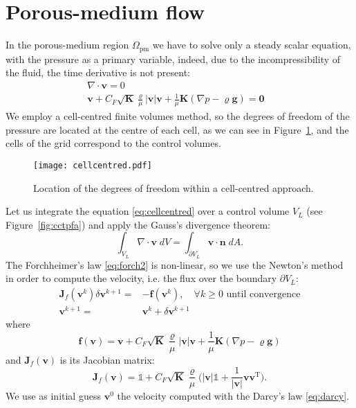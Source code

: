 \section{Porous-medium flow}
In the porous-medium region $\Omega_\text{pm}$ we have to solve only a steady 
scalar equation, with the pressure as a primary variable, indeed, due to the 
incompressibility of the fluid, the time derivative is not present:
\begin{align}
\label{eq:cellcentred}	\nabla \cdot \mathbf{v} = 0&\\
\label{eq:forch2}	\mathbf{v} + C_F \sqrt{\mathbf{K}} \frac{\varrho}{\mu} 
	|\mathbf{v}|\mathbf{v} + \frac{1}{\mu} \mathbf{K}(\nabla p - \varrho 
	\mathbf{g} ) = \mathbf{0}&
\end{align}
We employ a cell-centred finite volumes method, so the degrees of freedom of 
the pressure are located at the centre of each cell, as we can see in 
Figure~\ref{fig:cellcentred}, and the cells of the grid correspond to the 
control volumes.
\begin{figure}
	\centering
	\texttt{[image: cellcentred.pdf]}
	\caption[Cell-centred grid]{Location of the degrees of freedom within a 
	cell-centred approach.}
	\label{fig:cellcentred}
\end{figure}

Let us integrate the equation \eqref{eq:cellcentred} over a control volume 
$V_L$ (see Figure~\ref{fig:cctpfa}) and apply the Gauss's divergence theorem:
\begin{equation}
\int_{V_L} \nabla \cdot \mathbf{v} \; dV = \int_{\partial V_L} \mathbf{v} \cdot 
\mathbf{n} \; dA.
\end{equation}
The Forchheimer's law \eqref{eq:forch2} is non-linear, so we use the Newton's 
method in order to compute the velocity, i.e. the flux over the boundary 
$\partial 
V_L$:
\begin{align}
	\mathbf{J}_f(\mathbf{v}^k) \delta \mathbf{v}^{k+1} =& 
	-\mathbf{f}(\mathbf{v}^k), \quad \text{$\forall k\geq 0$ until 
	convergence}\\
	\mathbf{v}^{k+1} =& \mathbf{v}^k + \delta \mathbf{v}^{k+1}
\end{align}
where
\begin{equation} \label{eq:resforch}
	\mathbf{f}(\mathbf{v}) = \mathbf{v} + C_F \sqrt{\mathbf{K}} 
	\frac{\varrho}{\mu} 
	|\mathbf{v}|\mathbf{v} + \frac{1}{\mu} \mathbf{K}(\nabla p - \varrho 
	\mathbf{g} )
\end{equation}
and $\mathbf{J}_f(\mathbf{v})$ is its Jacobian matrix:
\begin{equation} \label{eq:jacforch}
\mathbf{J}_f(\mathbf{v}) = \mathbb{1} + 
C_F\sqrt{\mathbf{K}}\frac{\varrho}{\mu}\big(|\mathbf{v}|\mathbb{1} + 
\frac{1}{|\mathbf{v}|}{\mathbf{v}\mathbf{v}^\mathrm{T}}\big).
\end{equation}
We use as initial guess $\mathbf{v}^0$ the velocity computed with the Darcy's 
law \eqref{eq:darcy}.

